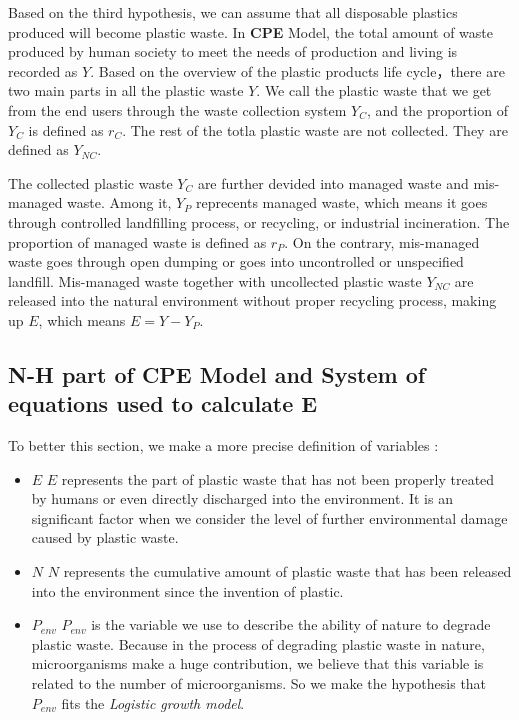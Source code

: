 \documentclass{mcmthesis}
\begin{document}
	 Based on the third hypothesis, we can assume that all disposable plastics produced will become plastic waste. In \textbf{CPE} Model, the total amount of waste produced by human society to meet the needs of production and living is recorded as $Y$. Based on the overview of the plastic products life cycle，there are two main parts in all the plastic waste $Y$. We call the plastic waste that we get from the end users through the waste collection system $Y_{C}$, and the proportion of $Y_C$ is defined as $r_C$. The rest of the totla plastic waste are not collected. They are defined as $Y_{NC}$. 
	
	The collected plastic waste $Y_C$ are further devided into managed waste and mis-managed waste. Among it, $Y_P$ reprecents managed waste, which means it goes through controlled landfilling process, or recycling, or industrial incineration. The proportion of managed waste is defined as $r_P$. On the contrary, mis-managed waste goes through open dumping or goes into uncontrolled or unspecified landfill. Mis-managed waste together with uncollected plastic waste $Y_{NC}$ are released into the natural environment without proper recycling process, making up $E$, which means $E=Y-Y_P$.
	   

 \subsection{N-H part of CPE Model and System of equations used to calculate E}
	   
	   To better this section, we make a more precise definition of variables :
	    \begin{itemize}
	      \item$E$ \qquad $E$ represents the part of plastic waste that has not been properly treated by humans or even directly discharged into the environment. It is an significant factor when we consider the level of further environmental damage caused by plastic waste.\\
	  
	      \item$N$ \qquad $N$ represents the cumulative amount of plastic waste that has been released into the environment since the invention of plastic.\\
	  
	      \item $P_{env}$ \quad $P_{env}$ is the variable we use to describe the ability of nature to degrade plastic waste. Because in the process of degrading plastic waste in nature, microorganisms make a huge contribution, we believe that this variable is related to the number of microorganisms. So we make the hypothesis that $P_{env}$ fits the \textit{Logistic growth model}. 
	    \end{itemize}
\end{document}
